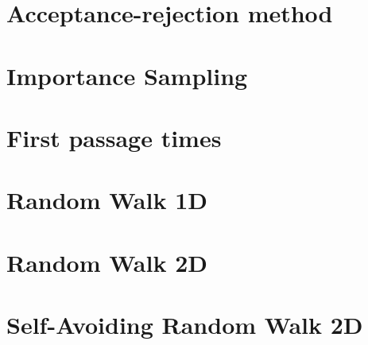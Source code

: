 \section{Acceptance-rejection method}

\section{Importance Sampling}

\section{First passage times}

\section{Random Walk 1D}

\section{Random Walk 2D}

\section{Self-Avoiding Random Walk 2D}



%
%


